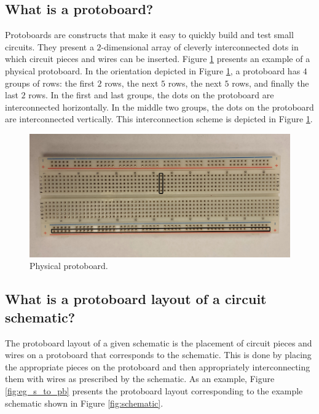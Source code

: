 \subsection{What is a protoboard?}

Protoboards are constructs that make it easy to quickly build and test small
circuits. They present a $2$-dimensional array of cleverly interconnected dots
in which circuit pieces and wires can be inserted. Figure
\ref{fig:physical_protoboard} presents an example of a physical protoboard. In
the orientation depicted in Figure \ref{fig:physical_protoboard}, a protoboard
has $4$ groups of rows: the first $2$ rows, the next $5$ rows, the next $5$
rows, and finally the last $2$ rows. In the first and last groups, the dots on
the protoboard are interconnected horizontally. In the middle
two groups, the dots on the protoboard are interconnected vertically. This
interconnection scheme is depicted in Figure \ref{fig:physical_protoboard}.

\begin{figure}
\begin{center}
\includegraphics[width=\textwidth]{Images/physical_protoboard.jpg}
\caption{Physical protoboard.}
\label{fig:physical_protoboard}
\end{center}
\end{figure}

\subsection{What is a protoboard layout of a circuit schematic?}

The protoboard layout of a given schematic is the placement of circuit pieces
and wires on a protoboard that corresponds to the schematic. This is done by
placing the appropriate pieces on the protoboard and then appropriately
interconnecting them with wires as prescribed by the schematic. As an example,
Figure \ref{fig:eg_s_to_pb} presents the protoboard layout corresponding to the
example schematic shown in Figure \ref{fig:schematic}.

